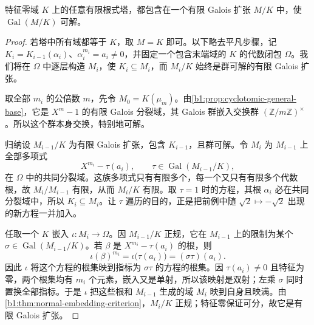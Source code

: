 \begin{lemma}\label{b1:lem:radical-normal-envelope}
	特征零域 \(K\) 上的任意有限根式塔，都包含在一个有限 Galois 扩张 \(M/K\) 中，使 \(\operatorname{Gal}(M/K)\) 可解。
\end{lemma}
\begin{proof}
	若塔中所有域都等于 \(K\)，取 \(M=K\) 即可。以下略去平凡步骤，记 \(K_i=K_{i-1}(\alpha_i)\)、\(\alpha_i^{m_i}=a_i\neq0\)，并固定一个包含末端域的 \(K\) 的代数闭包 \(\Omega\)。我们将在 \(\Omega\) 中逐层构造 \(M_i\)，使 \(K_i\subseteq M_i\)，而 \(M_i/K\) 始终是群可解的有限 Galois 扩张。

	取全部 \(m_i\) 的公倍数 \(m\)，先令 \(M_0=K(\mu_m)\)。由\cref{b1:prop:cyclotomic-general-base}，它是 \(X^m-1\) 的有限 Galois 分裂域，其 Galois 群嵌入交换群 \((\mathbb Z/m\mathbb Z)^\times\)。所以这个群本身交换，特别地可解。

	归纳设 \(M_{i-1}/K\) 为有限 Galois 扩张，包含 \(K_{i-1}\)，且群可解。令 \(M_i\) 为 \(M_{i-1}\) 上全部多项式
	\[
		X^{m_i}-\tau(a_i),\qquad\tau\in\operatorname{Gal}(M_{i-1}/K),
	\]
	在 \(\Omega\) 中的共同分裂域。这族多项式只有有限多个，每一个又只有有限多个代数根，故 \(M_i/M_{i-1}\) 有限，从而 \(M_i/K\) 有限。取 \(\tau=1\) 时的方程，其根 \(\alpha_i\) 必在共同分裂域中，所以 \(K_i\subseteq M_i\)。让 \(\tau\) 遍历的目的，正是把前例中随 \(\sqrt2\mapsto-\sqrt2\) 出现的新方程一并加入。

	任取一个 \(K\) 嵌入 \(\iota:M_i\rightarrow\Omega\)。因 \(M_{i-1}/K\) 正规，它在 \(M_{i-1}\) 上的限制为某个 \(\sigma\in\operatorname{Gal}(M_{i-1}/K)\)。若 \(\beta\) 是 \(X^{m_i}-\tau(a_i)\) 的根，则
	\[
		\iota(\beta)^{m_i}=\iota\bigl(\tau(a_i)\bigr)=(\sigma\tau)(a_i).
	\]
	因此 \(\iota\) 将这个方程的根集映到指标为 \(\sigma\tau\) 的方程的根集。因 \(\tau(a_i)\neq0\) 且特征为零，两个根集均有 \(m_i\) 个元素，嵌入又是单射，所以该映射是双射；左乘 \(\sigma\) 同时置换全部指标。于是 \(\iota\) 把这些根和 \(M_{i-1}\) 生成的域 \(M_i\) 映到自身且映满。由\cref{b1:thm:normal-embedding-criterion}，\(M_i/K\) 正规；特征零保证可分，故它是有限 Galois 扩张。


\end{proof}

